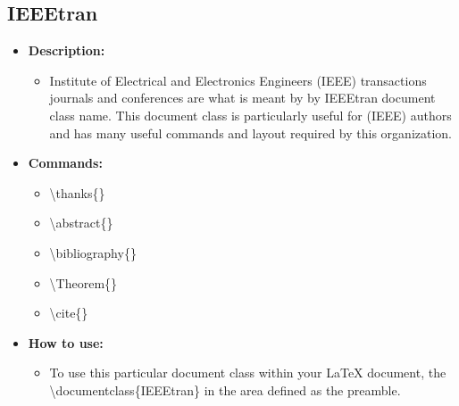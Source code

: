 \subsection{IEEEtran} 
\begin{itemize}
   \item \textbf{Description:}
      \begin{itemize}
      \item Institute of Electrical and Electronics Engineers (IEEE)
      transactions journals and conferences are what is meant by 
      by IEEEtran document class name. This document class is 
      particularly useful for (IEEE) authors and has many useful
      commands and layout required by this organization.
      \end{itemize}
   \item \textbf{Commands:}
      \begin{itemize}[label={}]
      \item \textbackslash{thanks\{\}}
      \item \textbackslash{abstract\{\}}
      \item \textbackslash{bibliography\{\}}
      \item \textbackslash{Theorem\{\}} 
      \item \textbackslash{cite\{\}}  
      \end{itemize}
   \item \textbf{How to use:}
      \begin{itemize}
      \item To use this particular document class within your \LaTeX{} 
       document, the \textbackslash{documentclass\{IEEEtran\}} in the 
       area defined as the preamble.
      \end{itemize}
\end{itemize}

